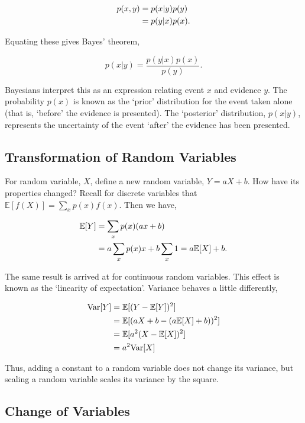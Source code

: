 \documentclass[11pt]{amsart}
\begin{document}
\begin{align}
p(x, y) &= p(x | y)p(y) \notag \\
&= p(y | x)p(x). \notag
\end{align}

Equating these gives Bayes' theorem,

$$p(x | y) = \frac{p(y | x)p(x)}{p(y)}.$$

Bayesians interpret this as an expression relating event $x$ and evidence $y$. The probability $p(x)$ is known as the `prior' distribution for the event taken alone (that is, `before' the evidence is presented). The `posterior' distribution, $p(x | y)$, represents the uncertainty of the event `after' the evidence has been presented.

\subsection{Transformation of Random Variables}

For random variable, $X$, define a new random variable, $Y = aX + b$. How have its properties changed? Recall for discrete variables that $\mathbb{E}[f(X)] = \sum_x p(x)f(x)$. Then we have,

\begin{align}
\mathbb{E}[Y] &= \sum_x p(x)(ax + b) \notag \\
&= a\sum_x p(x)x + b\sum_x 1 = a\mathbb{E}[X] + b. \notag
\end{align}

The same result is arrived at for continuous random variables. This effect is known as the `linearity of expectation'. Variance behaves a little differently,

\begin{align}
\text{Var}[Y] &= \mathbb{E}[(Y - \mathbb{E}[Y])^2] \notag \\
&= \mathbb{E}[(aX + b - (a\mathbb{E}[X] + b))^2] \notag \\
&= \mathbb{E}[a^2(X  - \mathbb{E}[X])^2] \notag \\
&= a^2\text{Var}[X] \notag
\end{align}

Thus, adding a constant to a random variable does not change its variance, but scaling a random variable scales its variance by the square.

\subsection{Change of Variables}
\end{document}
